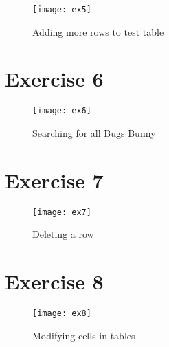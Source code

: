 \begin{figure}[H]
  \caption{Adding more rows to test table}
  \centering
  \texttt{[image: ex5]}
\end{figure}

\section{Exercise 6}

\begin{figure}[H]
  \caption{Searching for all Bugs Bunny}
  \centering
  \texttt{[image: ex6]}
\end{figure}

\section{Exercise 7}

\begin{figure}[H]
  \caption{Deleting a row}
  \centering
  \texttt{[image: ex7]}
\end{figure}

\section{Exercise 8}

\begin{figure}[H]
  \caption{Modifying cells in tables}
  \centering
  \texttt{[image: ex8]}
\end{figure}

